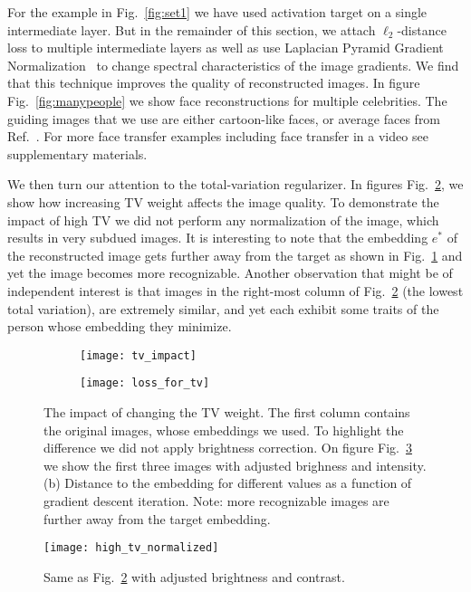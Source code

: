 \documentclass{article}
\def\Emb{e}
\newcommand{\Ref}[1]{Ref.~\citenum{#1}}
\newcommand{\Fig}[1]{Fig.~\ref{#1}}
\newcommand{\omtnips}[1]{#1}
\begin{document}
  For the example in \Fig{fig:set1} we have used activation target on a single intermediate layer.
  But in the remainder of this section, we attach $\ell_2$-distance loss to multiple intermediate layers as well as use
  Laplacian Pyramid Gradient Normalization~\cite{mordvintsev:15} to change spectral characteristics of the image gradients.
  We find that this technique improves the quality of reconstructed images.
  In figure \Fig{fig:manypeople} we show face reconstructions for multiple
  celebrities. The guiding images that we use are either cartoon-like faces, or average faces from \Ref{face-research-org}. For more face transfer examples including face transfer in a video see supplementary materials.

  We then turn our attention to the total-variation regularizer. In figures \Fig{fig:impact_of_tv}, we show how increasing TV weight affects the image quality. To demonstrate the impact of high TV we did not perform
  any normalization of the image, which results in very subdued images.
  It is interesting to note that
  the embedding $\Emb^*$ of the reconstructed image gets further away from the target as shown in \Fig{fig:loss_for_high_tv} and yet the
  image becomes more recognizable. Another observation that might be of independent interest
  is that images in the right-most column of \Fig{fig:impact_of_tv} (the lowest total variation), are extremely similar, and yet each exhibit some traits of the person whose embedding they minimize.

  \begin{figure}
      \centering
      \begin{subfigure}{.68\textwidth}
        \texttt{[image: tv\_impact]}
        \caption{}
      \end{subfigure}
      \begin{subfigure}{.3\textwidth}
      \centering
      \texttt{[image: loss\_for\_tv]}
      \caption{}
      \label{fig:loss_for_high_tv}
    \end{subfigure}
      \caption{
      The impact of changing the TV weight. The first column contains the original images, whose embeddings we used.
      To highlight the difference we did not apply brightness correction. \omtnips{On figure \Fig{fig:normalized} we show the first three images with adjusted brighness and intensity.}
      (b) Distance to the embedding for different values as a function of gradient descent iteration.
      Note: more recognizable images are further away from the target embedding.}
      \label{fig:impact_of_tv}
  \end{figure}
  \omtnips{
  \begin{figure}
      \centering
      \texttt{[image: high\_tv\_normalized]}
      \caption{Same as \Fig{fig:impact_of_tv} with adjusted brightness and contrast.}
      \label{fig:normalized}
  \end{figure}
  }
\end{document}
